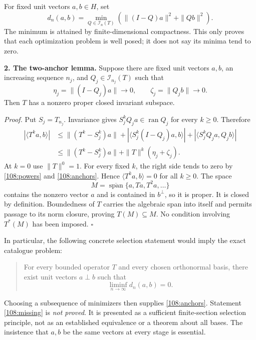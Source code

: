 \documentclass[11pt,a4paper]{article}
\numberwithin{equation}{section}
\begin{document}
For fixed unit vectors $a,b\in H$, set
\begin{equation}\label{108:objective}
 d_n(a,b)=\min_{Q\in\mathcal I_n(T)}
 \left(\|(I-Q)a\|^2+\|Qb\|^2\right).
\end{equation}
The minimum is attained by finite-dimensional compactness. This only proves
that each optimization problem is well posed; it does not say its minima
tend to zero.

\medskip
\textbf{2. The two-anchor lemma.}
Suppose there are fixed unit vectors $a,b$, an increasing sequence $n_j$, and
$Q_j\in\mathcal I_{n_j}(T)$ such that
\begin{equation}\label{108:anchors}
 \eta_j=\|(I-Q_j)a\|\longrightarrow0,
 \qquad \zeta_j=\|Q_jb\|\longrightarrow0.
\end{equation}
Then $T$ has a nonzero proper closed invariant subspace.

\emph{Proof.} Put $S_j=T_{n_j}$. Invariance gives
$S_j^kQ_ja\in\operatorname{ran}Q_j$ for every $k\geq0$. Therefore
\begin{align}
 |\langle T^ka,b\rangle|
 &\leq \|(T^k-S_j^k)a\|
       +|\langle S_j^k(I-Q_j)a,b\rangle|
       +|\langle S_j^kQ_ja,Q_jb\rangle|\nonumber\\
 &\leq\|(T^k-S_j^k)a\|+\|T\|^k(\eta_j+\zeta_j).
 \label{108:anchor-estimate}
\end{align}
At $k=0$ use $\|T\|^0=1$. For every fixed $k$, the right side tends to zero
by \eqref{108:powers} and \eqref{108:anchors}. Hence
$\langle T^ka,b\rangle=0$ for all $k\geq0$. The space
\begin{equation}\label{108:cyclic-space}
 M=\overline{\operatorname{span}}\{a,Ta,T^2a,\ldots\}
\end{equation}
contains the nonzero vector $a$ and is contained in $b^\perp$, so it is
proper. It is closed by definition. Boundedness of $T$ carries the algebraic
span into itself and permits passage to its norm closure, proving
$T(M)\subseteq M$. No condition involving $T^*(M)$ has been imposed.
$\square$

In particular, the following concrete selection statement would imply the
exact catalogue problem:
\begin{quote}
For every bounded operator $T$ and every chosen orthonormal basis, there
exist unit vectors $a\perp b$ such that
\begin{equation}\label{108:missing}
 \liminf_{n\to\infty}d_n(a,b)=0.
\end{equation}
\end{quote}
Choosing a subsequence of minimizers then supplies \eqref{108:anchors}.
Statement \eqref{108:missing} is \emph{not proved}. It is presented as a
sufficient finite-section selection principle, not as an established
equivalence or a theorem about all bases. The insistence that $a,b$ be the
same vectors at every stage is essential.
\end{document}

